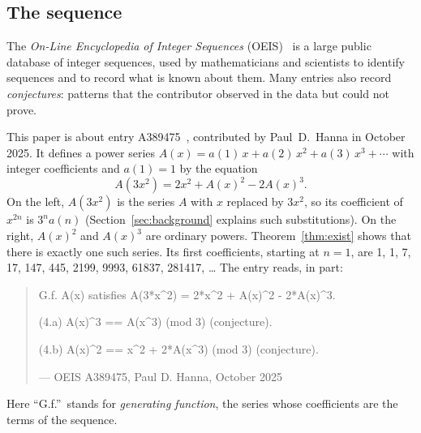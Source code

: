 \documentclass[11pt,a4paper]{article}
\theoremstyle{definition}
\theoremstyle{remark}
\begin{document}
\subsection{The sequence}\label{sec:sequence}
The \emph{On-Line Encyclopedia of Integer Sequences} (OEIS)~\cite{oeisdb} is a large public database of integer
sequences, used by mathematicians and scientists to identify sequences and to record what is known about them. Many
entries also record \emph{conjectures}: patterns that the contributor observed in the data but could not prove.

This paper is about entry A389475~\cite{oeis}, contributed by Paul~D.~Hanna in October 2025. It defines a power series
$A(x)=a(1)\,x+a(2)\,x^2+a(3)\,x^3+\cdots$ with integer coefficients and $a(1)=1$ by the equation
\begin{equation}\label{eq:oeis}
A(3x^2)=2x^2+A(x)^2-2A(x)^3 .
\end{equation}
On the left, $A(3x^2)$ is the series $A$ with $x$ replaced by $3x^2$, so its coefficient of $x^{2n}$ is $3^n a(n)$
(Section~\ref{sec:background} explains such substitutions). On the right, $A(x)^2$ and $A(x)^3$ are ordinary powers.
Theorem~\ref{thm:exist} shows that there is exactly one such series. Its first coefficients, starting at $n=1$, are
1, 1, 7, 17, 147, 445, 2199, 9993, 61837, 281417, \dots{} The entry reads, in part:
\begin{quote}\small\ttfamily\raggedright G.f. A(x) satisfies A(3*x\^{}2) = 2*x\^{}2 + A(x)\^{}2 - 2*A(x)\^{}3.\par\smallskip (4.a) A(x)\^{}3 == A(x\^{}3) (mod 3) (conjecture).\par\smallskip (4.b) A(x)\^{}2 == x\^{}2 + 2*A(x\^{}3) (mod 3) (conjecture).\par\smallskip\hfill\textrm{--- OEIS A389475, Paul D. Hanna, October 2025}\end{quote}

Here ``G.f.''\ stands for \emph{generating function}, the series whose coefficients are the terms of the sequence.
\end{document}
